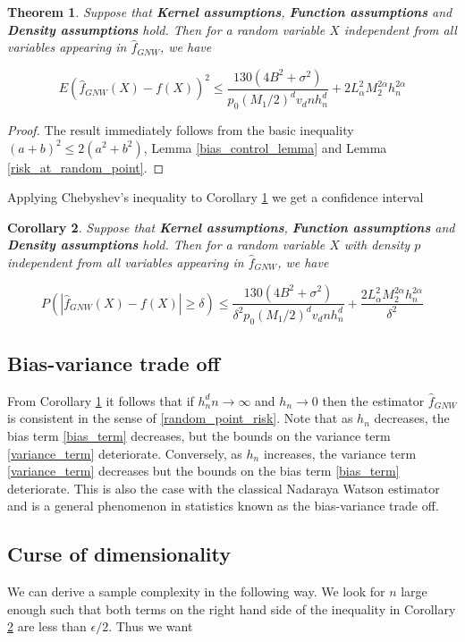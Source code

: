 \documentclass{article}
\newtheorem{theorem}{Theorem}[section]
\newtheorem{corollary}[theorem]{Corollary}
\begin{document}
\begin{theorem}
\label{final_result}
Suppose that \textbf{Kernel assumptions}, \textbf{Function assumptions} and \textbf{Density assumptions} hold. Then for a random variable $X$ independent from all variables appearing in $\hat{f}_{GNW}$, we have

\begin{equation*}
    E(\hat{f}_{GNW}(X)-f(X))^2\leq \frac{130(4B^2+\sigma^2)}{p_0(M_1/2)^dv_dnh_n^d}+2L^2_{\alpha}M_2^{2\alpha}h_n^{2\alpha}
\end{equation*}
\end{theorem}
\begin{proof}
The result immediately follows from the basic inequality $(a+b)^2\leq 2(a^2+b^2)$, Lemma \ref{bias_control_lemma} and Lemma  \ref{risk_at_random_point}.
\end{proof}
Applying Chebyshev's inequality to Corollary \ref{final_result} we get a confidence interval 
\begin{corollary}
\label{final_result_concentration}
Suppose that \textbf{Kernel assumptions}, \textbf{Function assumptions} and \textbf{Density assumptions} hold. Then for a random variable $X$ with density $p$ independent from all variables appearing in $\hat{f}_{GNW}$, we have

\begin{equation*}
    P(|\hat{f}_{GNW}(X)-f(X)|\geq \delta)\leq \frac{130(4B^2+\sigma^2)}{\delta^2p_0(M_1/2)^dv_dnh_n^d}+\frac{2L_{\alpha}^2M_2^{2\alpha}h_n^{2\alpha}}{\delta^2}
\end{equation*}


\end{corollary}



\subsection{Bias-variance trade off}
From  Corollary \ref{final_result} it follows that if $h_n^dn\to\infty$ and $h_n\to 0$ then the estimator $\hat{f}_{GNW}$ is consistent in the sense of \ref{random_point_risk}. Note that as $h_n$ decreases, the bias term \ref{bias_term} decreases, but the bounds on the variance term \ref{variance_term} deteriorate. Conversely, as $h_n$ increases, the variance term \ref{variance_term} decreases but the bounds on the bias term \ref{bias_term} deteriorate. This is also the case with the classical Nadaraya Watson estimator and is a general phenomenon in statistics known as the bias-variance trade off. 
\subsection{Curse of dimensionality}
We can derive a sample complexity in the following way. We look for $n$ large enough such that both terms on the right hand side of the inequality in Corollary \ref{final_result_concentration} are less than $\epsilon/2$.
Thus we want
\end{document}
